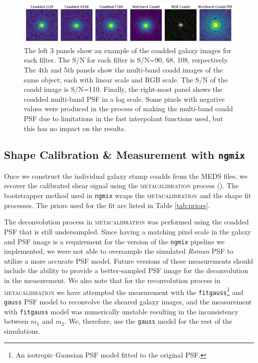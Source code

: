 \documentclass[fleqn,usenatbib]{mnras}
\begin{document}
\begin{figure}
	\includegraphics[width=\textwidth]{coadd_galaxy_example_log_v2.pdf}
    \caption{The left 3 panels show an example of the coadded galaxy images for each filter. The S/N for each filter is S/N=90, 68, 108, respectively. The 4th and 5th panels show the multi-band coadd images of the same object; each with linear scale and RGB scale. The S/N of the coadd image is S/N=110. Finally, the right-most panel shows the coadded multi-band PSF in a log scale. Some pixels with negative values were produced in the process of making the multi-band coadd PSF due to limitations in the fast interpolant functions used, but this has no impact on the results. }
    \label{fig:single_to_coadd_rgb}
\end{figure}


\subsection{Shape Calibration \& Measurement with \texttt{ngmix}}
\label{subsec:mcal}
Once we construct the individual galaxy stamp coadds from the MEDS files, we recover the calibrated shear signal using the \textsc{metacalibration} process (\citealt{2017arXiv170202600H, 2017ApJ...841...24S}). The bootstrapper method used in \texttt{ngmix} wraps the \textsc{metacalibration} and the shape fit processes. The priors used for the fit are listed in Table \ref{tab:priors}.

The deconvolution process in  \textsc{metacalibration} was performed using the coadded PSF that is still undersampled. Since having a matching pixel scale in the galaxy and PSF image is a requirement for the version of the \texttt{ngmix} pipeline we implemented, we were not able to oversample the simulated \emph{Roman} PSF to utilize a more accurate PSF model. Future versions of these measurements should include the ability to provide a better-sampled PSF image for the deconvolution in the measurement. 
We also note that for the reconvolution process in \textsc{metacalibration} we have attempted the measurement with the \texttt{fitgauss}\footnote{An isotropic Gaussian PSF model fitted to the original PSF.} and \texttt{gauss} PSF model to reconvolve the sheared galaxy images, and the measurement with \texttt{fitgauss} model was numerically unstable resulting in the inconsistency between $m_{1}$ and $m_{2}$. We, therefore, use the \texttt{gauss} model for the rest of the simulations.
\end{document}
